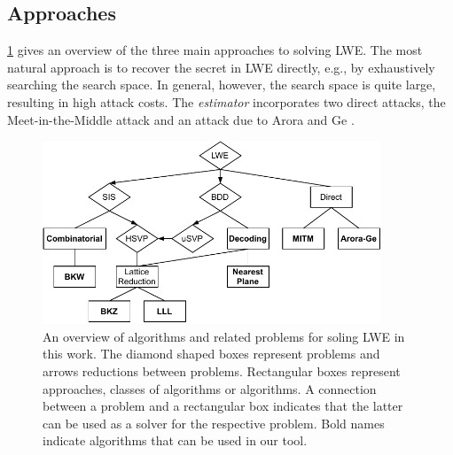 \subsection{Approaches}
\cref{fig:algorithms} gives an overview of the three main approaches to solving LWE. The most natural approach is to recover the secret in LWE directly, e.g., by exhaustively searching the search space. In general, however, the search space is quite large, resulting in high attack costs. The \textit{estimator} incorporates two direct attacks, the Meet-in-the-Middle attack \cite{BG14} and an attack due to Arora and Ge \cite{AG11}. %
\begin{figure}[h]
  \centering
  \includegraphics[width=0.9\textwidth]{graphics/algorithms_overview.pdf}
  \caption[An Overview of Algorithms and Related Problems for Solving LWE]{An overview of algorithms and related problems for soling LWE in this work. The diamond shaped boxes represent problems and arrows reductions between problems. Rectangular boxes represent approaches, classes of algorithms or algorithms. A connection between a problem and a rectangular box indicates that the latter can be used as a solver for the respective problem. Bold names indicate algorithms that can be used in our tool.}\label{fig:algorithms}
\end{figure}

